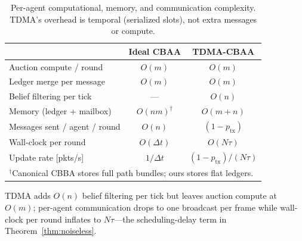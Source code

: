 \begin{table}[t]
\centering
\caption{Per-agent computational, memory, and communication complexity. TDMA's overhead is temporal (serialized slots), not extra messages or compute.}
\label{tab:complexity}
\begin{tabular}{@{}lcc@{}}
\toprule
 & Ideal CBAA & TDMA-CBAA \\
\midrule
Auction compute / round & $O(m)$ & $O(m)$ \\
Ledger merge per message & $O(m)$ & $O(m)$ \\
Belief filtering per tick & --- & $O(n)$ \\
Memory (ledger + mailbox) & $O(nm)^{\dagger}$ & $O(m + n)$ \\
Messages sent / agent / round & $O(n)$ & $(1-p_{\mathrm{tx}})$ \\
Wall-clock per round & $O(\Delta t)$ & $O(N\tau)$ \\
Update rate [pkts/s] & $1/\Delta t$ & $(1-p_{\mathrm{tx}})/(N\tau)$ \\
\bottomrule
\multicolumn{3}{l}{\footnotesize $^{\dagger}$Canonical CBBA stores full path bundles; ours stores flat ledgers.}\\
\end{tabular}
\end{table}

TDMA adds $O(n)$ belief filtering per tick but leaves auction compute at $O(m)$; per-agent communication drops to one broadcast per frame while wall-clock per round inflates to $N\tau$---the scheduling-delay term in Theorem~\ref{thm:noiseless}.
